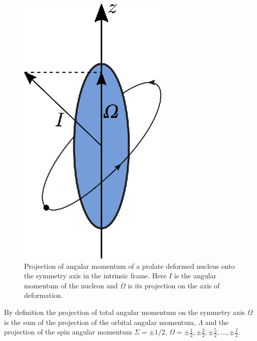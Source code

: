 \documentclass[10pt,a4paper, twoside, openright]{report}
\begin{document}
\begin{figure}
\centering
\includegraphics[scale=1]{./figures/prolate_AM.eps}
\caption[Angular moment projections in deformed nuclei]{Projection of angular momentum of a prolate deformed nucleus onto the symmetry axis in the intrinsic frame. Here $I$ is the angular momentum of the nucleon and $\Omega$ is its projection on the axis of deformation.}
\label{fig:prolate_AM}
\end{figure}
By definition the projection of total angular momentum on the symmetry axis $\Omega$ is the sum of the projection of the orbital angular momentum, $\Lambda$ and the projection of the spin angular momentum $\Sigma = \pm 1/2$,  $\Omega = \pm\tfrac{1}{2}, \pm\tfrac{3}{2},  \pm\tfrac{5}{2},  ... ,  \pm\tfrac{I}{2}$.\\
\linebreak
\end{document}
